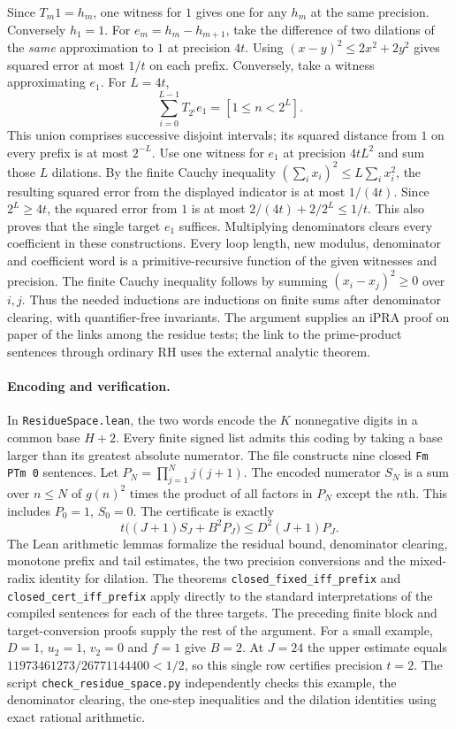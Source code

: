 Since $T_m1=h_m$, one witness for $1$ gives one for any $h_m$ at the
same precision. Conversely $h_1=1$. For $e_m=h_m-h_{m+1}$, take the
difference of two dilations of the \emph{same} approximation to $1$ at
precision $4t$. Using $(x-y)^2\le2x^2+2y^2$ gives squared error at most
$1/t$ on each prefix. Conversely, take a witness approximating $e_1$.
For $L=4t$,
\[
   \sum_{i=0}^{L-1} T_{2^i}e_1=[1\le n<2^L].
\]
This union comprises successive disjoint intervals; its squared
distance from $1$ on every prefix is at most $2^{-L}$. Use one witness
for $e_1$ at precision $4tL^2$ and sum those $L$ dilations. By the finite
Cauchy inequality $(\sum_i x_i)^2\le L\sum_i x_i^2$, the resulting
squared error from the displayed indicator is at most $1/(4t)$.
Since $2^L\ge4t$, the squared error from $1$ is at most
$2/(4t)+2/2^L\le1/t$. This also proves that the single target $e_1$
suffices. Multiplying denominators clears every coefficient in these
constructions. Every loop length, new modulus, denominator and coefficient
word is a primitive-recursive function of the given witnesses and
precision. The finite Cauchy inequality follows by summing
$(x_i-x_j)^2\ge0$ over $i,j$. Thus the needed inductions are inductions
on finite sums after denominator clearing, with quantifier-free
invariants. The argument supplies an iPRA proof on paper of the links
among the residue tests; the link to the prime-product sentences through
ordinary RH uses the external analytic theorem.

\paragraph{Encoding and verification.}
In \texttt{ResidueSpace.lean}, the two words encode the $K$ nonnegative
digits in a common base $H+2$. Every finite signed list admits this coding
by taking a base larger than its greatest absolute numerator. The file
constructs nine closed \texttt{Fm PTm 0} sentences. Let
$P_N=\prod_{j=1}^N j(j+1)$. The encoded numerator $S_N$ is a sum over
$n\le N$ of $g(n)^2$ times the product of all factors in $P_N$ except
the $n$th. This includes $P_0=1$, $S_0=0$.
The certificate is exactly
\[
 t\big((J+1)S_J+B^2P_J\big)\le D^2(J+1)P_J.
\]
The Lean arithmetic lemmas formalize the residual bound, denominator
clearing, monotone prefix and tail estimates, the two precision
conversions and the mixed-radix identity for dilation. The theorems
\texttt{closed\_fixed\_iff\_prefix} and
\texttt{closed\_cert\_iff\_prefix} apply directly to the standard
interpretations of the compiled sentences for each of the three targets. The preceding
finite block and target-conversion proofs supply the rest of the argument.
For a small example, $D=1$, $u_2=1$, $v_2=0$ and $f=1$ give $B=2$.
At $J=24$ the upper estimate equals $11973461273/26771144400<1/2$, so this
single row certifies precision $t=2$. The script
\texttt{check\_residue\_space.py} independently checks this example, the
denominator clearing, the one-step inequalities and the dilation identities
using exact rational arithmetic.
